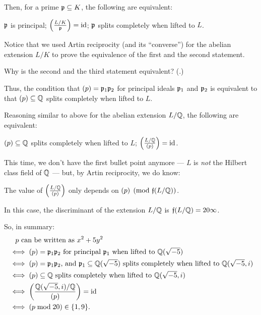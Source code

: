 Then, for a prime $\mathfrak p \subseteq K$, the following are equivalent:
\begin{enumerate}
	\ii $\mathfrak p$ is principal;
	\ii $\left(\frac{L/K}{\mathfrak p}\right) = \mathrm{id}$;
	\ii $\mathfrak p$ splits completely when lifted to $L$.
\end{enumerate}

Notice that we used Artin reciprocity (and its ``converse'') for the abelian extension $L/K$
to prove the equivalence of the first and the second statement.
\begin{exercise}
	Why is the second and the third statement equivalent?
	(.)
\end{exercise}

Thus, the condition that $(p) = \mathfrak p_1 \mathfrak p_2$ for principal ideals $\mathfrak p_1$ and $\mathfrak p_2$ is equivalent
to that $(p) \subseteq \mathbb Q$ splits completely when lifted to $L$.

Reasoning similar to above for the abelian extension $L/\mathbb Q$, the following are equivalent:
\begin{enumerate}
	\ii $(p) \subseteq \mathbb Q$ splits completely when lifted to $L$;
	\ii $\left(\frac{L/\mathbb Q}{(p)}\right) = \mathrm{id}$.
\end{enumerate}

This time, we don't have the first bullet point anymore --- $L$ is \emph{not} the
Hilbert class field of $\mathbb Q$ --- but, by Artin reciprocity, we do know:
\begin{moral}
	The value of $\left(\frac{L/\mathbb Q}{(p)}\right)$ only depends on $(p) \pmod{\mathfrak f(L/\mathbb Q)}$.
\end{moral}
In this case, the discriminant of the extension $L/\mathbb Q$ is $\mathfrak f(L/\mathbb Q) = 20 \infty$.

So, in summary:
\begin{align*}
	&\quad \text{$p$ can be written as $x^2 + 5y^2$} \\
	&\iff \text{$(p) = \mathfrak p_1 \mathfrak p_2$ for principal $\mathfrak p_1$ when lifted to $\mathbb Q(\sqrt{-5})$} \\
	&\iff \text{$(p) = \mathfrak p_1 \mathfrak p_2$, and $\mathfrak p_1 \subseteq \mathbb Q(\sqrt{-5})$ splits completely
		when lifted to $\mathbb Q(\sqrt{-5}, i)$} \\
	&\iff \text{$(p) \subseteq \mathbb Q$ splits completely when lifted to $\mathbb Q(\sqrt{-5}, i)$} \\
	&\iff \left( \frac{\mathbb Q(\sqrt{-5}, i)/\mathbb Q}{(p)} \right) = \mathrm{id} \\
	&\iff (p \bmod 20) \in \{ 1, 9 \}.
\end{align*}

